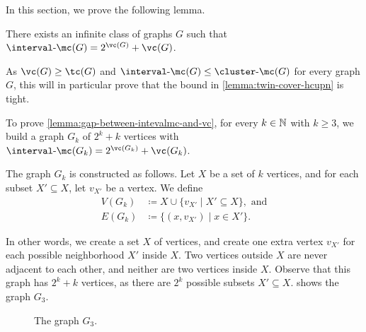\newcommand{\graph}[1][k]{G_{#1}}

In this section, we prove the following lemma.

\begin{lemma}
    \label{lemma:gap-between-intevalmc-and-vc}
    There exists an infinite class of graphs $G$ such that $\intervalmc(G) = 2^{\vc(G)} + \vc(G)$. 
\end{lemma}

As $\vc(G) \geq \tc(G)$ and $\intervalmc(G) \leq \clustermc(G)$ for every graph $G$, this will in particular prove that the bound in \cref{lemma:twin-cover-hcupn} is tight.

To prove \cref{lemma:gap-between-intevalmc-and-vc}, for every $k \in \mathbb{N}$ with $k \geq 3$, we build a graph $\graph$ of $2^k + k$ vertices with $\intervalmc(\graph) = 2^{\vc(\graph)} + \vc(\graph)$.

The graph $\graph$ is constructed as follows.
Let $X$ be a set of $k$ vertices, and for each subset $X' \subseteq X$, let $v_{X'}$ be a vertex. We define
\begin{align*}
    V(\graph) &\coloneq X \cup \{v_{X'} \mid X' \subseteq X\}, \text{ and}\\
    E(\graph) &\coloneq \{(x, v_{X'}) \mid x \in X'\}.
\end{align*}

In other words, we create a set $X$ of vertices, and create one extra vertex $v_{X'}$ for each possible neighborhood $X'$ inside $X$. Two vertices outside $X$ are never adjacent to each other, and neither are two vertices inside $X$. Observe that this graph has $2^k + k$ vertices, as there are $2^k$ possible subsets $X' \subseteq X$.  shows the graph $\graph[3]$.

\begin{figure}[ht]
    \centering
{}
    \caption{The graph $\graph[3]$.}
    \label{fig:G-k}
\end{figure}

